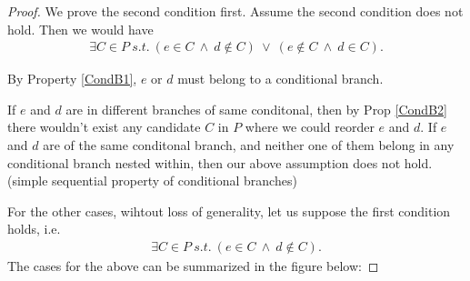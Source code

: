         \begin{proof}

            We prove the second condition first. 
            Assume the second condition does not hold. Then we would have
            \begin{align*}
                \exists C \in P \ s.t. \ 
                (e \in C \ \wedge \ d \notin C) \ \vee \ 
                (e \notin C \ \wedge \ d \in C).
            \end{align*}
            
            By Property \ref{CondB1}, $e$ or $d$ must belong to a conditional branch. 
            
            If $e$ and $d$ are in different branches of same conditonal, then by Prop \ref{CondB2} there wouldn't exist any candidate $C$ in $P$ where we could reorder $e$ and $d$. 
            If $e$ and $d$ are of the same conditonal branch, and neither one of them belong in any conditional branch nested within, then our above assumption does not hold. (simple sequential property of conditional branches)
            
            For the other cases, wihtout loss of generality, let us suppose the first condition holds, i.e. 
            \begin{align*}
                \exists C \in P \ s.t. \ 
                (e \in C \ \wedge \ d \notin C).
            \end{align*}
            The cases for the above can be summarized in the figure below:
            

\end{proof}
